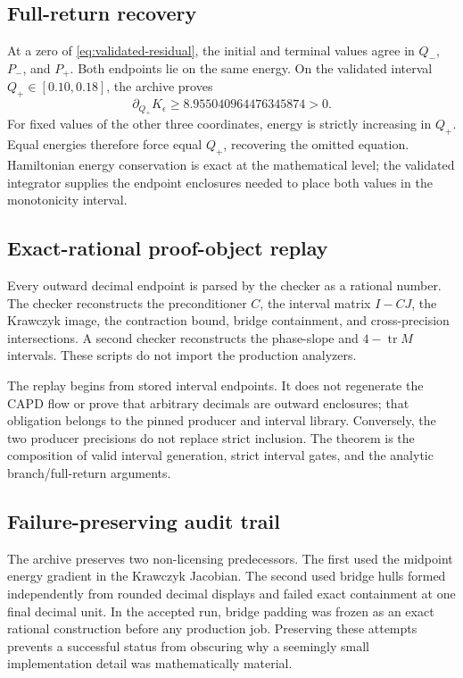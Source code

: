 \subsection{Full-return recovery}

At a zero of \cref{eq:validated-residual}, the initial and terminal values
agree in \(Q_-\), \(P_-\), and \(P_+\).  Both endpoints lie on the same
energy.  On the validated interval \(Q_+\in[0.10,0.18]\), the archive proves
\begin{equation}
 \partial_{Q_+}K_\epsilon\ge
 8.955040964476345874>0.
 \label{eq:phase-slope-min}
\end{equation}
For fixed values of the other three coordinates, energy is strictly
increasing in \(Q_+\).  Equal energies therefore force equal \(Q_+\),
recovering the omitted equation.  Hamiltonian energy conservation is exact
at the mathematical level; the validated integrator supplies the endpoint
enclosures needed to place both values in the monotonicity interval.

\subsection{Exact-rational proof-object replay}

Every outward decimal endpoint is parsed by the checker as a rational
number.  The checker reconstructs the preconditioner \(C\), the interval
matrix \(I-CJ\), the Krawczyk image, the contraction bound, bridge
containment, and cross-precision intersections.  A second checker reconstructs
the phase-slope and \(4-\operatorname{tr}M\) intervals.  These scripts do not
import the production analyzers.

The replay begins from stored interval endpoints.  It does not regenerate
the CAPD flow or prove that arbitrary decimals are outward enclosures; that
obligation belongs to the pinned producer and interval library.  Conversely,
the two producer precisions do not replace strict inclusion.  The theorem is
the composition of valid interval generation, strict interval gates, and
the analytic branch/full-return arguments.

\subsection{Failure-preserving audit trail}

The archive preserves two non-licensing predecessors.  The first used the
midpoint energy gradient in the Krawczyk Jacobian.  The second used bridge
hulls formed independently from rounded decimal displays and failed exact
containment at one final decimal unit.  In the accepted run, bridge padding
was frozen as an exact rational construction before any production job.
Preserving these attempts prevents a successful status from obscuring why a
seemingly small implementation detail was mathematically material.

